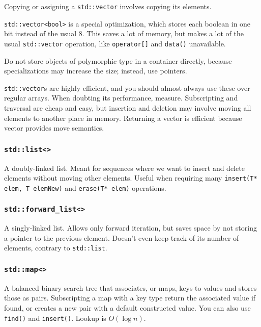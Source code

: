 \documentclass[8pt, table, xcdraw]{article}%
\begin{document}
Copying or assigning a \lstinline{std::vector} involves copying its elements.

\lstinline{std::vector<bool>} is a special optimization, which stores each boolean in one bit instead of the usual 8. This saves a lot of memory, but makes a lot of the usual \lstinline{std::vector} operation, like \lstinline{operator[]} and \lstinline{data()} unavailable.

Do not store objects of polymorphic type in a container directly, because specializations may increase the size; instead, use pointers.

\lstinline{std::vector}s are highly efficient, and you should almost always use these over regular arrays. When doubting its performance, measure. Subscripting and traversal are cheap and easy, but insertion and deletion may involve moving all elements to another place in memory. Returning a vector is efficient because vector provides move semantics.

\subsubsection{\lstinline{std::list<>}} \label{std_list}

A doubly-linked list. Meant for sequences where we want to insert and delete elements without moving other elements. Useful when requiring many \lstinline{insert(T* elem, T elemNew)} and \lstinline{erase(T* elem)} operations.

\subsubsection{\lstinline{std::forward_list<>}} \label{std_forward_list}

A singly-linked list. Allows only forward iteration, but saves space by not storing a pointer to the previous element. Doesn't even keep track of its number of elements, contrary to \lstinline{std::list}.

\subsubsection{\lstinline{std::map<>}} \label{std_map}

A balanced binary search tree that associates, or maps, keys to values and stores those as pairs. Subscripting a map with a key type return the associated value if found, or creates a new pair with a default constructed value. You can also use \lstinline{find()} and \lstinline{insert()}. Lookup is $O(\log n)$.
\end{document}

